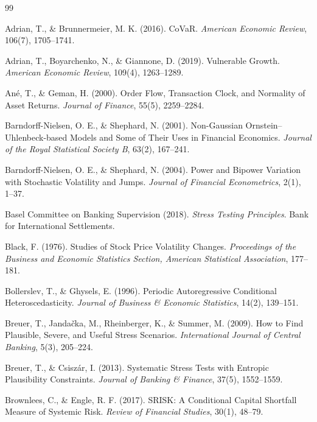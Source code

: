 \documentclass[11pt]{article}
\theoremstyle{definition}
\begin{document}
\begin{thebibliography}{99}
\footnotesize
\setlength{\itemsep}{0pt}

 Adrian, T., \& Brunnermeier, M. K. (2016). CoVaR. \textit{American Economic Review}, 106(7), 1705--1741.

 Adrian, T., Boyarchenko, N., \& Giannone, D. (2019). Vulnerable Growth. \textit{American Economic Review}, 109(4), 1263--1289.

 Ané, T., \& Geman, H. (2000). Order Flow, Transaction Clock, and Normality of Asset Returns. \textit{Journal of Finance}, 55(5), 2259--2284.

 Barndorff-Nielsen, O. E., \& Shephard, N. (2001). Non-Gaussian Ornstein--Uhlenbeck-based Models and Some of Their Uses in Financial Economics. \textit{Journal of the Royal Statistical Society B}, 63(2), 167--241.

 Barndorff-Nielsen, O. E., \& Shephard, N. (2004). Power and Bipower Variation with Stochastic Volatility and Jumps. \textit{Journal of Financial Econometrics}, 2(1), 1--37.

 Basel Committee on Banking Supervision (2018). \textit{Stress Testing Principles}. Bank for International Settlements.

 Black, F. (1976). Studies of Stock Price Volatility Changes. \textit{Proceedings of the Business and Economic Statistics Section, American Statistical Association}, 177--181.

 Bollerslev, T., \& Ghysels, E. (1996). Periodic Autoregressive Conditional Heteroscedasticity. \textit{Journal of Business \& Economic Statistics}, 14(2), 139--151.

 Breuer, T., Jandačka, M., Rheinberger, K., \& Summer, M. (2009). How to Find Plausible, Severe, and Useful Stress Scenarios. \textit{International Journal of Central Banking}, 5(3), 205--224.

 Breuer, T., \& Csiszár, I. (2013). Systematic Stress Tests with Entropic Plausibility Constraints. \textit{Journal of Banking \& Finance}, 37(5), 1552--1559.

 Brownlees, C., \& Engle, R. F. (2017). SRISK: A Conditional Capital Shortfall Measure of Systemic Risk. \textit{Review of Financial Studies}, 30(1), 48--79.


\end{thebibliography}
\end{document}
